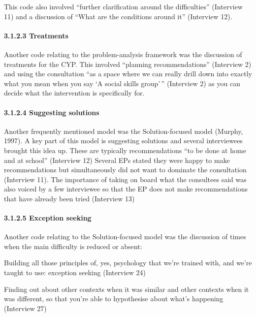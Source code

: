 \documentclass[
]{article}
\begin{document}
This code also involved ``further clarification around the
difficulties'' (Interview 11) and a discussion of ``What are the
conditions around it'' (Interview 12).

\hypertarget{treatments}{%
\paragraph{3.1.2.3 Treatments}\label{treatments}}

Another code relating to the problem-analysis framework was the
discussion of treatments for the CYP. This involved ``planning
recommendations'' (Interview 2) and using the consultation ``as a space
where we can really drill down into exactly what you mean when you say
`A social skills group'\,'' (Interview 2) as you can decide what the
intervention is specifically for.

\hypertarget{suggesting-solutions}{%
\paragraph{3.1.2.4 Suggesting solutions}\label{suggesting-solutions}}

Another frequently mentioned model was the Solution-focused model
(Murphy, 1997). A key part of this model is suggesting solutions and
several interviewees brought this idea up. These are typically
recommendations ``to be done at home and at school'' (Interview 12)
Several EPs stated they were happy to make recommendations but
simultaneously did not want to dominate the consultation (Interview 11).
The importance of taking on board what the consultees said was also
voiced by a few interviewee so that the EP does not make recommendations
that have already been tried (Interview 13)

\hypertarget{exception-seeking}{%
\paragraph{3.1.2.5 Exception seeking}\label{exception-seeking}}

Another code relating to the Solution-focused model was the discussion
of times when the main difficulty is reduced or absent:

Building all those principles of, yes, psychology that we're trained
with, and we're taught to use: exception seeking (Interview 24)

Finding out about other contexts when it was similar and other contexts
when it was different, so that you're able to hypothesise about what's
happening (Interview 27)
\end{document}
